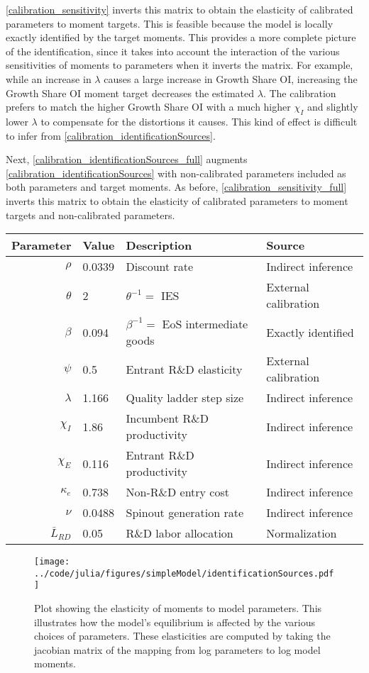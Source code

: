 \documentclass[11pt,english]{article}
\theoremstyle{remark}
\begin{document}
\autoref{calibration_sensitivity} inverts this matrix to obtain the elasticity of calibrated parameters to moment targets. This is feasible because the model is locally exactly identified by the target moments. This provides a more complete picture of the identification, since it takes into account the interaction of the various sensitivities of moments to parameters when it inverts the matrix. For example, while an increase in $\lambda$ causes a large increase in Growth Share OI, increasing the Growth Share OI moment target decreases the estimated $\lambda$. The calibration prefers to match the higher Growth Share OI with a much higher $\chi_I$ and slightly lower $\lambda$ to compensate for the distortions it causes. This kind of effect is difficult to infer from \autoref{calibration_identificationSources}. 

Next, \autoref{calibration_identificationSources_full} augments \autoref{calibration_identificationSources} with non-calibrated parameters included as both parameters and target moments. As before, \autoref{calibration_sensitivity_full} inverts this matrix to obtain the elasticity of calibrated parameters to moment targets and non-calibrated parameters. 

\begin{table}[]
	\centering
	\label{calibration_parameters}
	\begin{tabular}{rlll}
		\toprule \toprule
		Parameter & Value & Description & Source \tabularnewline
		\midrule
		$\rho$ & 0.0339 & Discount rate  & Indirect inference \tabularnewline
		$\theta$ & 2 & $\theta^{-1} = $ IES & External calibration 
		\tabularnewline
		$\beta$ & 0.094 & $\beta^{-1} = $ EoS intermediate goods & Exactly identified \tabularnewline 
		$\psi$ & 0.5 & Entrant R\&D elasticity & External calibration \tabularnewline
		$\lambda$ & 1.166 & Quality ladder step size & Indirect inference 
		\tabularnewline
		$\chi_I$ & 1.86 & Incumbent R\&D productivity & Indirect inference 
		\tabularnewline
		$\chi_E$ & 0.116 & Entrant R\&D productivity & Indirect inference \tabularnewline 
		$\kappa_e$ & 0.738 & Non-R\&D entry cost & Indirect inference \tabularnewline
		$\nu$ & 0.0488 & Spinout generation rate  & Indirect inference\tabularnewline
		$\bar{L}_{RD}$ & 0.05 & R\&D labor allocation  & Normalization \tabularnewline
		\bottomrule
	\end{tabular}
\end{table}

\begin{figure}[]
	\texttt{[image: ../code/julia/figures/simpleModel/identificationSources.pdf]}
	\caption{Plot showing the elasticity of moments to model parameters. This illustrates how the model's equilibrium is affected by the various choices of parameters. These elasticities are computed by taking the jacobian matrix of the mapping from log parameters to log model moments.}
	\label{calibration_identificationSources}
\end{figure}
\end{document}
